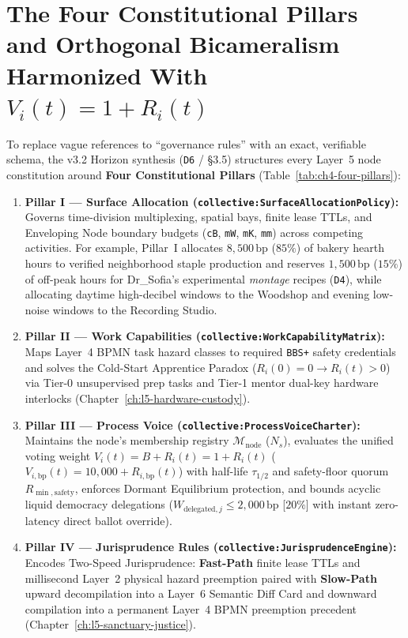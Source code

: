 \section{The Four Constitutional Pillars and Orthogonal Bicameralism Harmonized With $V_i(t) = 1 + R_i(t)$}
\label{sec:ch4-bicameralism}

To replace vague references to ``governance rules'' with an exact, verifiable schema, the v3.2
Horizon synthesis (\texttt{D6} / \S3.5) structures every Layer~5 node constitution around
\textbf{Four Constitutional Pillars} (Table~\ref{tab:ch4-four-pillars}):
\begin{enumerate}
\item \textbf{Pillar I --- Surface Allocation (\texttt{collective:SurfaceAllocationPolicy}):}
        Governs time-division multiplexing, spatial bays, finite lease TTLs, and Enveloping Node
        boundary budgets (\texttt{cB}, \texttt{mW}, \texttt{mK}, \texttt{mm}) across competing
        activities. For example, Pillar~I allocates $8{,}500\,\mathrm{bp}$ ($85\%$) of bakery
        hearth hours to verified neighborhood staple production and reserves $1{,}500\,\mathrm{bp}$
        ($15\%$) of off-peak hours for Dr\_Sofia's experimental \textit{montage} recipes
        (\texttt{D4}), while allocating daytime high-decibel windows to the Woodshop and evening
        low-noise windows to the Recording Studio.
\item \textbf{Pillar II --- Work Capabilities (\texttt{collective:WorkCapabilityMatrix}):}
        Maps Layer~4 BPMN task hazard classes to required \texttt{BBS+} safety credentials and
        solves the Cold-Start Apprentice Paradox ($R_i(0) = 0 \to R_i(t) > 0$) via Tier-0
        unsupervised prep tasks and Tier-1 mentor dual-key hardware interlocks
        (Chapter~\ref{ch:l5-hardware-custody}).
\item \textbf{Pillar III --- Process Voice (\texttt{collective:ProcessVoiceCharter}):}
        Maintains the node's membership registry $\mathcal{M}_{\mathrm{node}}$ ($N_s$), evaluates
        the unified voting weight $V_i(t) = B + R_i(t) = 1 + R_i(t)$
        ($V_{i,\mathrm{bp}}(t) = 10{,}000 + R_{i,\mathrm{bp}}(t)$) with half-life $\tau_{1/2}$ and
        safety-floor quorum $R_{\min,\mathrm{safety}}$, enforces Dormant Equilibrium protection,
        and bounds acyclic liquid democracy delegations ($W_{\mathrm{delegated},j} \le 2{,}000\,\mathrm{bp}$
        [$20\%$] with instant zero-latency direct ballot override).
\item \textbf{Pillar IV --- Jurisprudence Rules (\texttt{collective:JurisprudenceEngine}):}
        Encodes Two-Speed Jurisprudence: \textbf{Fast-Path} finite lease TTLs and millisecond Layer~2
        physical hazard preemption paired with \textbf{Slow-Path} upward decompilation into a Layer~6
        Semantic Diff Card and downward compilation into a permanent Layer~4 BPMN preemption
        precedent (Chapter~\ref{ch:l5-sanctuary-justice}).
\end{enumerate}

